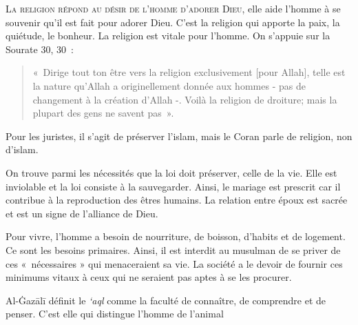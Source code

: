 
\textsc{La religion répond au désir de l'homme d'adorer Dieu,} elle aide
l'homme à se souvenir qu'il est fait pour adorer Dieu. C'est la religion
qui apporte la paix, la quiétude, le bonheur. La religion est vitale
pour l'homme. On s'appuie sur la Sourate 30, 30~: 
\begin{quote}
    «~Dirige tout ton
être vers la religion exclusivement {[}pour Allah{]}, telle est la
nature qu'Allah a originellement donnée aux hommes - pas de changement à
la création d'Allah -. Voilà la religion de droiture; mais la plupart
des gens ne savent pas~».
\end{quote}

Pour les juristes, il s'agit de préserver l'islam, mais le Coran parle
de religion, non d'islam.


On trouve parmi les nécessités que la loi doit préserver, celle de la
vie. Elle est inviolable et la loi consiste à la sauvegarder. Ainsi, le
mariage est prescrit car il contribue à la reproduction des êtres
humains. La relation entre époux est sacrée et est un signe de
l'alliance de Dieu.

Pour vivre, l'homme a besoin de nourriture, de boisson, d'habits et de
logement. Ce sont les besoins primaires. Ainsi, il est interdit au
musulman de se priver de ces «~nécessaires » qui menaceraient sa vie. La
société a le devoir de fournir ces minimums vitaux à ceux qui ne
seraient pas aptes à se les procurer.


\begin{Def}
Al-Ġazālī \label{theol:AlGazali21} définit le \emph{`aql} comme la faculté de connaître, de
comprendre et de penser. C'est elle qui distingue l'homme de
l'animal
\end{Def}

